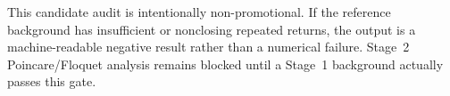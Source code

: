 This candidate audit is intentionally non-promotional. If the reference background has insufficient or nonclosing repeated returns, the output is a machine-readable negative result rather than a numerical failure. Stage~2 Poincare/Floquet analysis remains blocked until a Stage~1 background actually passes this gate.
